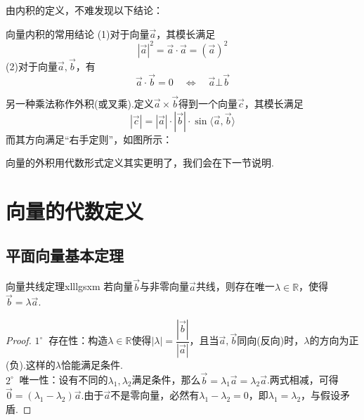 \documentclass[lang=cn, zihao=5]{elegantbook}
\newcommand{\R}{\mathbb{R}}
\newcommand{\buzhou}[1]{$#1^{\circ} \ $}
\begin{document}

由内积的定义，不难发现以下结论：

\begin{proposition}{向量内积的常用结论}
	(1)对于向量$\vec{a}$，其模长满足$$|\vec{a}|^2=\vec{a} \cdot \vec{a} = (\vec{a})^2$$
	(2)对于向量$\vec{a},\vec{b}$，有$$\vec{a} \cdot \vec{b} = 0 \quad \Longleftrightarrow \quad \vec{a} \bot \vec{b}$$
\end{proposition}

另一种乘法称作外积(或叉乘).定义$\vec{a} \times \vec{b}$得到一个向量$\vec{c}$，其模长满足$$|\vec{c}|=|\vec{a}| \cdot |\vec{b}| \cdot \sin \langle \vec{a},\vec{b} \rangle $$
而其方向满足“右手定则”，如图所示：


向量的外积用代数形式定义其实更明了，我们会在下一节说明.

\section{向量的代数定义}

\subsection{平面向量基本定理}

\begin{theorem}{向量共线定理}{xlllgsxm}
	若向量$\vec{b}$与非零向量$\vec{a}$共线，则存在唯一$\lambda \in \R$，使得$\vec{b} = \lambda \vec{a}$.
\end{theorem}
\begin{proof}
	\buzhou{1} 存在性：构造$\lambda \in \R$使得$|\lambda | = \dfrac{|\vec{b}|}{|\vec{a}|}$，且当$\vec{a},\vec{b}$同向(反向)时，$\lambda$的方向为正(负).这样的$\lambda$恰能满足条件. \\
	\buzhou{2} 唯一性：设有不同的$\lambda _1,\lambda _2$满足条件，那么$\vec{b} = \lambda _1 \vec{a} = \lambda _2 \vec{a}$.两式相减，可得$\vec{0}=(\lambda _1 - \lambda _2)\vec{a}$.由于$\vec{a}$不是零向量，必然有$\lambda _1 - \lambda _2=0$，即$\lambda _1=\lambda _2$，与假设矛盾.
\end{proof}
\end{document}
